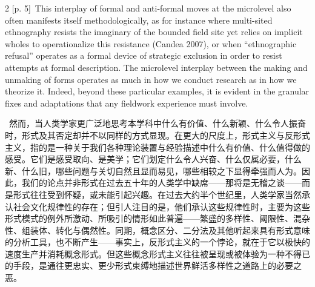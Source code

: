 \documentclass[10pt,a4paper]{article}
\begin{document}
\begin{paracol}{2}
\switchcolumn
{\scriptsize\color{gray} [p. 5]}\ This interplay of formal and anti-formal moves at the microlevel also often manifests itself methodologically, as for instance where multi-sited ethnography resists the imaginary of the bounded field site yet relies on implicit wholes to operationalize this resistance (Candea 2007), or when “ethnographic refusal” operates as a formal device of strategic exclusion in order to resist attempts at formal description. The microlevel interplay between the making and unmaking of forms operates as much in how we conduct research as in how we theorize it. Indeed, beyond these particular examples, it is evident in the granular fixes and adaptations that any fieldwork experience must involve.\par
\switchcolumn*
{\scriptsize\color{gray} [p. 5]}\ 然而，当人类学家更广泛地思考本学科中什么有价值、什么新颖、什么令人振奋时，形式及其否定却并不以同样的方式显现。在更大的尺度上，形式主义与反形式主义，指的是一种关于我们各种理论装置与经验描述中什么有价值、什么值得做的感受。它们是感受取向、是美学；它们划定什么令人兴奋、什么仅属必要，什么新、什么旧，哪些问题与关切自然且显而易见，哪些相较之下显得牵强而人为。因此，我们的论点并非形式在过去五十年的人类学中缺席——那将是无稽之谈——而是形式往往受到怀疑，或未能引起兴趣。在过去大约半个世纪里，人类学家当然承认社会文化规律性的存在；但引人注目的是，他们承认这些规律性时，主要为这些形式模式的例外所激动、所吸引的情形如此普遍——繁盛的多样性、阈限性、混杂性、组装体、转化与偶然性。同期，概念区分、二分法及其他听起来具有形式意味的分析工具，也不断产生——事实上，反形式主义的一个悖论，就在于它以极快的速度生产并消耗概念形式。但这些概念形式主义往往被呈现或被体验为一种不得已的手段，是通往更忠实、更少形式束缚地描述世界鲜活多样性之道路上的必要之恶。\par
\switchcolumn

\end{paracol}
\end{document}
